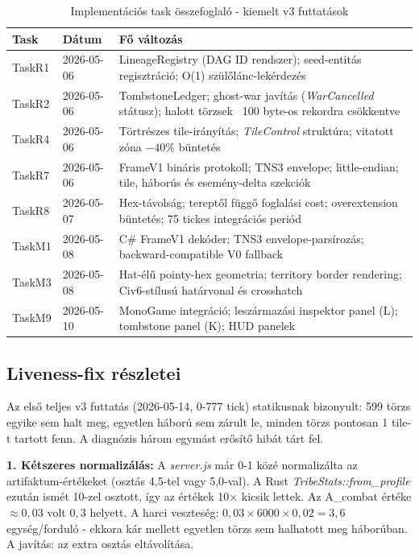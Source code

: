 \begin{table}[h]
\centering
\caption{Implementációs task összefoglaló - kiemelt v3 futtatások}
\label{tab:tasks}
\begin{tabular}{llp{8cm}}
\hline
\textbf{Task} & \textbf{Dátum} & \textbf{Fő változás} \\
\hline
TaskR1 & 2026-05-06 & LineageRegistry (DAG ID rendszer); seed-entitás regisztráció; O(1) szülőlánc-lekérdezés \\
TaskR2 & 2026-05-06 & TombstoneLedger; ghost-war javítás (\textit{WarCancelled} státusz); halott törzsek ~100 byte-os rekordra csökkentve \\
TaskR4 & 2026-05-06 & Törtrészes tile-irányítás; \textit{TileControl} struktúra; vitatott zóna $-40\%$ büntetés \\
TaskR7 & 2026-05-06 & FrameV1 bináris protokoll; TNS3 envelope; little-endian; tile, háborús és esemény-delta szekciók \\
TaskR8 & 2026-05-07 & Hex-távolság; tereptől függő foglalási cost; overextension büntetés; 75 tickes integrációs periód \\
TaskM1 & 2026-05-08 & C\# FrameV1 dekóder; TNS3 envelope-parsírozás; backward-compatible V0 fallback \\
TaskM3 & 2026-05-08 & Hat-élű pointy-hex geometria; territory border rendering; Civ6-stílusú határvonal és crosshatch \\
TaskM9 & 2026-05-10 & MonoGame integráció; leszármazási inspektor panel (L); tombstone panel (K); HUD panelek \\
\hline
\end{tabular}
\end{table}

\subsection*{Liveness-fix részletei}

Az első teljes v3 futtatás (2026-05-14, 0-777 tick) statikusnak bizonyult: 599 törzs egyike sem halt meg, egyetlen háború sem zárult le, minden törzs pontosan 1 tile-t tartott fenn. A diagnózis három egymást erősítő hibát tárt fel.

\textbf{1. Kétszeres normalizálás:} A \textit{server.js} már 0-1 közé normalizálta az artifaktum-értékeket (osztás 4,5-tel vagy 5,0-val). A Rust \textit{TribeStats::from\_profile} ezután ismét 10-zel osztott, így az értékek 10$\times$ kicsik lettek. Az A\_combat értéke $\approx 0{,}03$ volt $0{,}3$ helyett. A harci veszteség: $0{,}03 \times 6000 \times 0{,}02 = 3{,}6$ egység/forduló - ekkora kár mellett egyetlen törzs sem halhatott meg háborúban. A javítás: az extra osztás eltávolítása.

